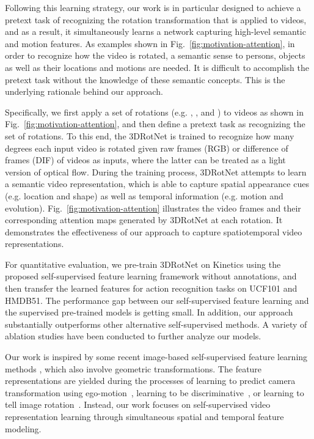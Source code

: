\documentclass[10pt,twocolumn,letterpaper]{article}
\begin{document}
Following this learning strategy, our work is in particular designed to achieve a pretext task of recognizing the rotation transformation that is applied to videos, and as a result, it simultaneously learns a network capturing high-level semantic and motion features. As examples shown in Fig.~\ref{fig:motivation-attention}, in order to recognize how the video is rotated, a semantic sense to persons, objects as well as their locations and motions are needed. It is difficult to accomplish the pretext task without the knowledge of these semantic concepts. This is the underlying rationale behind our approach.  

Specifically, we first apply a set of rotations (e.g. , ,  and ) to videos as shown in Fig.~\ref{fig:motivation-attention}, and then define a pretext task as recognizing the set of rotations. To this end, the 3DRotNet is trained to recognize how many degrees each input video is rotated given raw frames (RGB) or difference of frames (DIF) of videos as inputs, where the latter can be treated as a light version of optical flow. During the training process, 3DRotNet attempts to learn a semantic video representation, which is able to capture spatial appearance cues (e.g. location and shape) as well as temporal information (e.g. motion and evolution). Fig.~\ref{fig:motivation-attention} illustrates the video frames and their corresponding attention maps generated by 3DRotNet at each rotation. It demonstrates the effectiveness of our approach to capture spatiotemporal video representations.

For quantitative evaluation, we pre-train 3DRotNet on Kinetics using the proposed self-supervised feature learning framework without annotations, and then transfer the learned features for action recognition tasks on UCF101 and HMDB51. The performance gap between our self-supervised feature learning and the supervised pre-trained models is getting small. In addition, our approach substantially outperforms other alternative self-supervised methods. A variety of ablation studies have been conducted to further analyze our models. 

Our work is inspired by some recent image-based self-supervised feature learning methods \cite{dosovitskiy2014discriminative, agrawal2015learning, rotation}, which also involve geometric transformations. The feature representations are yielded during the processes of learning to predict camera transformation using ego-motion~\cite{agrawal2015learning}, learning to be discriminative~\cite{dosovitskiy2014discriminative}, or learning to tell image rotation~\cite{rotation}. Instead, our work focuses on self-supervised video representation learning through simultaneous spatial and temporal feature modeling. 
\end{document}
